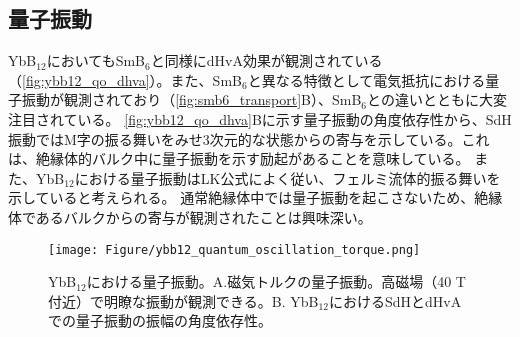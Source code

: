 

\subsection{量子振動}
YbB$_{12}$においてもSmB$_6$と同様にdHvA効果が観測されている（\autoref{fig:ybb12_qo_dhva}）。また、SmB$_6$と異なる特徴として電気抵抗における量子振動が観測されており（\autoref{fig:smb6_transport}B）、SmB$_6$との違いとともに大変注目されている\cite{YbB12_byXiang65}。
\autoref{fig:ybb12_qo_dhva}Bに示す量子振動の角度依存性から、SdH振動ではM字の振る舞いをみせ3次元的な状態からの寄与を示している。これは、絶縁体的バルク中に量子振動を示す励起があることを意味している。 
また、YbB$_{12}$における量子振動はLK公式によく従い、フェルミ流体的振る舞いを示していると考えられる。
通常絶縁体中では量子振動を起こさないため、絶縁体であるバルクからの寄与が観測されたことは興味深い。

\begin{figure*}[!thb]
	\begin{center}
		\texttt{[image: Figure/ybb12\_quantum\_oscillation\_torque.png]}
\caption{YbB$_{12}$における量子振動\cite{YbB12_byXiang65}。A.磁気トルクの量子振動。高磁場（40 T付近）で明瞭な振動が観測できる。B. YbB$_{12}$におけるSdHとdHvAでの量子振動の振幅の角度依存性。}
\label{fig:ybb12_qo_dhva}
    \end{center}
\end{figure*}


